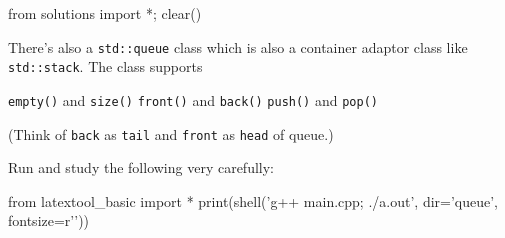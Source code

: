 \begin{python0}
from solutions import *; clear()
\end{python0}

There's also a \verb!std::queue! class which is also a
container adaptor class like \verb!std::stack!.
The class supports
\begin{tightlist}
  \li \texttt{empty()} and \texttt{size()}
  \li \texttt{front()} and \texttt{back()}
  \li \texttt{push()} and \texttt{pop()}
\end{tightlist}
(Think of
\texttt{back} as \texttt{tail}
and
\texttt{front} as \texttt{head} of queue.)

Run and study the following very carefully:
\begin{python}
from latextool_basic import *
print(shell('g++ main.cpp; ./a.out', dir='queue', fontsize=r'\footnotesize'))  
\end{python}
